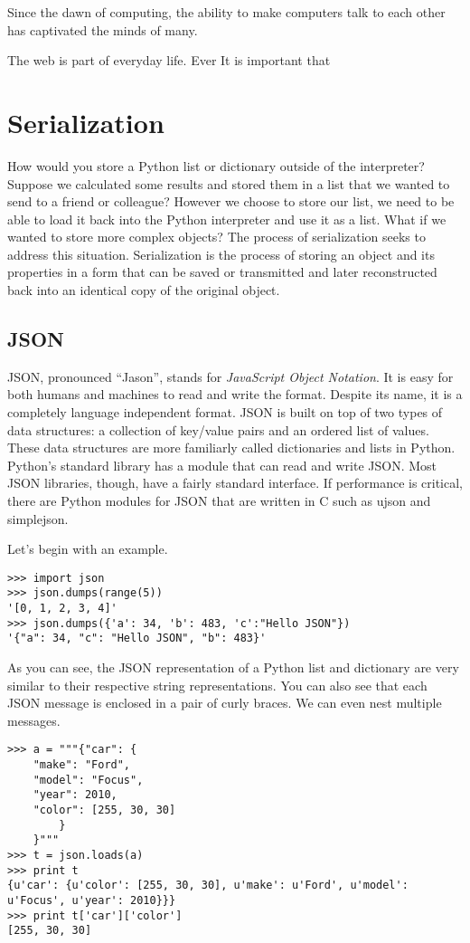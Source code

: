 \label{lab:webtech}

Since the dawn of computing, the ability to make computers talk to each other has captivated the minds of many.


The web is part of everyday life.
Ever
It is important that 

\section*{Serialization}
How would you store a Python list or dictionary outside of the interpreter?
Suppose we calculated some results and stored them in a list that we wanted to send to a friend or colleague?
However we choose to store our list, we need to be able to load it back into the Python interpreter and use it as a list.
What if we wanted to store more complex objects?
The process of serialization seeks to address this situation.
Serialization is the process of storing an object and its properties in a form that can be saved or transmitted and later reconstructed back into an identical copy of the original object.

\subsection*{JSON}
JSON, pronounced ``Jason'', stands for \emph{JavaScript Object Notation}.
It is easy for both humans and machines to read and write the format.
Despite its name, it is a completely language independent format.
JSON is built on top of two types of data structures: a collection of key/value pairs and an ordered list of values.
These data structures are more familiarly called dictionaries and lists in Python.
Python's standard library has a module that can read and write JSON.
Most JSON libraries, though, have a fairly standard interface.
If performance is critical, there are Python modules for JSON that are written in C such as ujson and simplejson.

Let's begin with an example.
\begin{lstlisting}
>>> import json
>>> json.dumps(range(5))
'[0, 1, 2, 3, 4]'
>>> json.dumps({'a': 34, 'b': 483, 'c':"Hello JSON"})
'{"a": 34, "c": "Hello JSON", "b": 483}'
\end{lstlisting}
As you can see, the JSON representation of a Python list and dictionary are very similar to their respective string representations.
You can also see that each JSON message is enclosed in a pair of curly braces.
We can even nest multiple messages.
\begin{lstlisting}
>>> a = """{"car": {
    "make": "Ford",
    "model": "Focus",
    "year": 2010,
    "color": [255, 30, 30]
        }
    }"""
>>> t = json.loads(a)
>>> print t 
{u'car': {u'color': [255, 30, 30], u'make': u'Ford', u'model': u'Focus', u'year': 2010}}}
>>> print t['car']['color']
[255, 30, 30]
\end{lstlisting}

